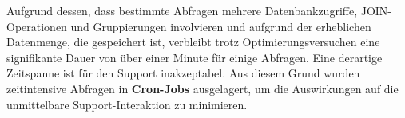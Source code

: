 Aufgrund dessen, dass bestimmte Abfragen mehrere Datenbankzugriffe, JOIN-Operationen und Gruppierungen involvieren und aufgrund der erheblichen Datenmenge, die gespeichert ist, verbleibt trotz Optimierungsversuchen eine signifikante Dauer von über einer Minute für einige Abfragen. Eine derartige Zeitspanne ist für den Support inakzeptabel. Aus diesem Grund wurden zeitintensive Abfragen in \textbf{Cron-Jobs} ausgelagert, um die Auswirkungen auf die unmittelbare Support-Interaktion zu minimieren.